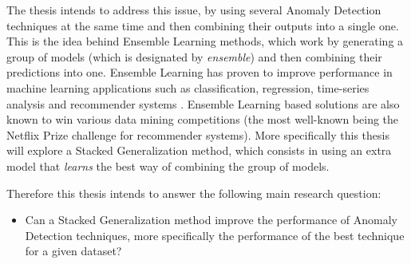 The thesis intends to address this issue, by using several Anomaly Detection techniques at the same time and then combining their outputs into a single one.
This is the idea behind Ensemble Learning methods, which work by generating a group of models (which is designated by \textit{ensemble}) and then combining their predictions into one.
Ensemble Learning has proven to improve performance in machine learning applications such as classification, regression, time-series analysis and recommender systems \cite{Aggarwal:2013:OA:2436823}.
Ensemble Learning based solutions are also known to win various data mining competitions (the most well-known being the Netflix Prize challenge for recommender systems).
More specifically this thesis will explore a Stacked Generalization method, which consists in using an extra model that \textit{learns} the best way of combining the group of models.


Therefore this thesis intends to answer the following main research question:

\begin{itemize}
	\item Can a Stacked Generalization method improve the performance of Anomaly Detection techniques, more specifically the performance of the best technique for a given dataset?
\end{itemize}


